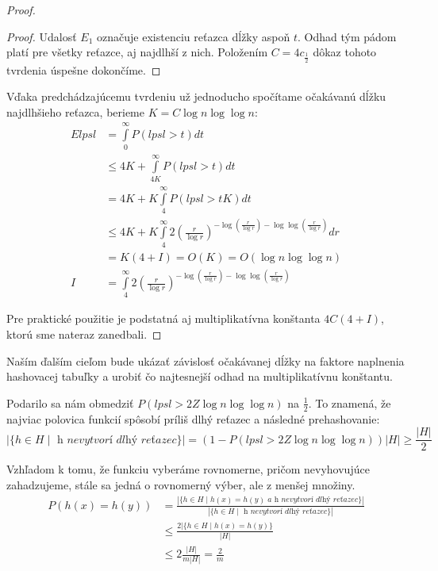 \begin{proof}
\begin{proof}
Udalosť $E_1$ označuje existenciu reťazca dĺžky aspoň $t$. Odhad tým pádom platí pre všetky reťazce, aj najdlhší z nich. Položením $C = 4c_{\frac{1}{2}}$ dôkaz tohoto tvrdenia úspešne dokončíme.
\end{proof}

Vďaka predchádzajúcemu tvrdeniu už jednoducho spočítame očakávanú dĺžku najdlhšieho reťazca, berieme $K = C\log n \log \log n$:
\begin{displaymath}
\begin{split}
E lpsl 
	& = \int\limits_0^{\infty} P(lpsl > t) dt \\
	& \leq 4K + \int\limits_{4K}^\infty P(lpsl > t) dt \\
	& = 4K + K \int\limits_4^\infty P(lpsl > tK) dt \\
	& \leq 4K + K \int\limits_4^\infty 2 \left(\frac{r}{\log r}\right)^{-\log \left(\frac{r}{\log r}\right) - \log \log \left(\frac{r}{\log r}\right)} dr \\
	& = K(4 + I) = O(K) = O(\log n \log \log n) \\
I 	& = \int\limits_4^\infty 2 \left(\frac{r}{\log r}\right)^{-\log \left(\frac{r}{\log r}\right) - \log \log \left(\frac{r}{\log r}\right)}
\end{split}
\end{displaymath}

Pre praktické použitie je podstatná aj multiplikatívna konštanta $4C(4 + I)$, ktorú sme nateraz zanedbali.
\end{proof}

Naším ďalším cieľom bude ukázať závislosť očakávanej dĺžky na faktore naplnenia hashovacej tabuľky a urobiť čo najtesnejší odhad na multiplikatívnu konštantu.

Podarilo sa nám obmedziť $P(lpsl > 2Z \log n \log \log n)$ na $\frac{1}{2}$. To znamená, že najviac polovica funkcií spôsobí príliš dlhý reťazec a následné prehashovanie:
\begin{displaymath}
|\lbrace h \in H \mid \textit{ h nevytvorí dlhý reťazec} \rbrace| = \left(1 - P(lpsl > 2Z \log n \log \log n)\right) |H| \geq \frac{|H|}{2}
\end{displaymath}

Vzhľadom k tomu, že funkciu vyberáme rovnomerne, pričom nevyhovujúce zahadzujeme, stále sa jedná o rovnomerný výber, ale z menšej množiny.
\begin{displaymath}
\begin{split}
P(h(x) = h(y)) 
	& =  \frac{|\lbrace h \in H \mid h(x) = h(y) \textit{ a h nevytvorí dlhý reťazec} \rbrace |}{|\lbrace h \in H \mid \textit{ h nevytvorí dlhý reťazec} \rbrace|} \\
	& \leq \frac{2 |\lbrace h \in H \mid h(x) = h(y) \rbrace}{|H|} \\
	& \leq 2 \frac{|H|}{m |H|} = \frac{2}{m}
\end{split}
\end{displaymath}

